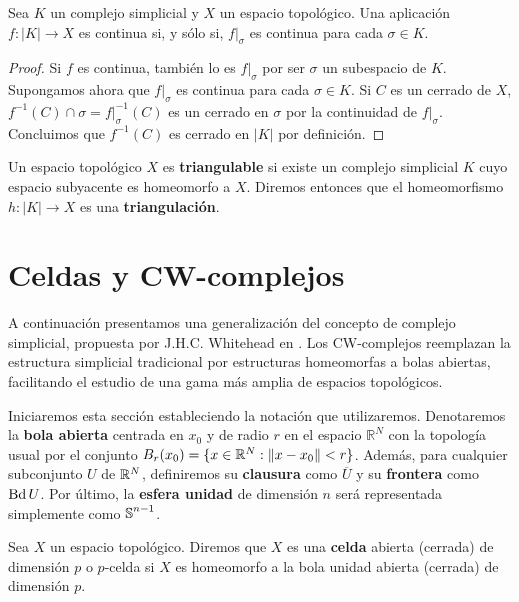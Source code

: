 \begin{lema}
	\label{lem:cont_poly} Sea $K$ un complejo simplicial y $X$ un espacio topológico.
	Una aplicación $f: |K| \rightarrow X$ es continua si, y sólo si, $f|_{\sigma}$
	es continua para cada $\sigma \in K$.
\end{lema}
\begin{proof}
	Si $f$ es continua, también lo es $f|_{\sigma}$ por ser $\sigma$ un subespacio
	de $K$. Supongamos ahora que $f|_{\sigma}$ es continua para cada $\sigma \in K$.
	Si $C$ es un cerrado de $X$, $f^{-1}(C) \cap \sigma = f|_{\sigma}^{-1}(C)$ es un
	cerrado en $\sigma$ por la continuidad de $f|_{\sigma}$. Concluimos que
	$f^{-1}(C)$ es cerrado en $|K|$ por definición.
\end{proof}
\begin{definicion}
	Un espacio topológico $X$ es \textbf{triangulable} si existe un complejo
	simplicial $K$ cuyo espacio subyacente es homeomorfo a $X$. Diremos entonces que
	el homeomorfismo $h: |K| \rightarrow X$ es una \textbf{triangulación}.
\end{definicion}

\section{Celdas y CW-complejos}

A continuación presentamos una generalización del concepto de complejo
simplicial, propuesta por J.H.C. Whitehead en \cite{MR0030759}. Los CW-complejos
reemplazan la estructura simplicial tradicional por estructuras homeomorfas a bolas
abiertas, facilitando el estudio de una gama más amplia de espacios topológicos.

Iniciaremos esta sección estableciendo la notación que utilizaremos. Denotaremos
la \textbf{bola abierta} centrada en $x_{0}$ y de radio $r$ en el espacio
$\mathbb{R}^{N}$ con la topología usual por el conjunto
$B_{r}(x_{0}) = \{ x \in \mathbb{R}^{N} : \| x - x_{0} \| < r \}$. Además, para
cualquier subconjunto $U$ de $\mathbb{R}^{N}$, definiremos su \textbf{clausura} como
$\overline{U}$ y su \textbf{frontera} como $\operatorname{Bd} U$. Por último, la \textbf{esfera
	unidad} de dimensión $n$ será representada simplemente como $\operatorname{\mathbb{S}}^{n-1}$.

\begin{definicion}
	Sea $X$ un espacio topológico. Diremos que $X$ es una \textbf{celda} abierta (cerrada)
	de dimensión $p$ o $p$-celda si $X$ es homeomorfo a la bola unidad abierta (cerrada)
	de dimensión $p$.
\end{definicion}

